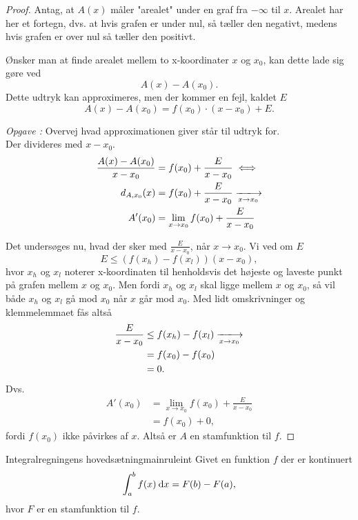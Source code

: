 \documentclass{article}
\newcounter{opgavecnt}
\newcommand{\opg}[1]{\stepcounter{opgavecnt}\textit{Opgave \arabic{opgavecnt}: }#1}
\begin{document}
\begin{proof}
Antag, at $A(x)$ måler "arealet" under en graf fra $-\infty$ til $x$. Arealet
har her et fortegn, dvs. at hvis grafen er under nul, så tæller den negativt,
medens hvis grafen er over nul så tæller den positivt.

Ønsker man at finde arealet mellem to x-koordinater $x$ og $x_0$, kan dette
lade sig gøre ved
\[
    A(x) - A(x_0).
\] 
Dette udtryk kan approximeres, men der kommer en fejl, kaldet $E$
\[
    A(x) - A(x_0) = f(x_0) \cdot (x-x_0) + E.
\] 

\opg{Overvej hvad approximationen giver står til udtryk for.}\\
Der divideres med $x-x_0$.
\begin{align*}
    \frac{A(x)-A(x_0)}{x-x_0} &= f(x_0) + \frac{E}{x-x_0}\iff\\
    \sek{A}{x_0}(x) &= f(x_0) + \frac{E}{x-x_0} \xlongrightarrow[x \to x_0]{}\\
    A'(x_0) &= \lim_{x \to x_0} f(x_0) + \frac{E}{x-x_0}
\end{align*}

Det undersøges nu, hvad der sker med $\frac{E}{x-x_0}$, når $x \to x_0$.
Vi ved om $E$
\[
    E \le (f(x_h) - f(x_l))(x-x_0),
\] 
hvor $x_h$ og $x_l$ noterer x-koordinaten til henholdsvis det højeste og
laveste punkt på grafen mellem $x$ og $x_0$. Men fordi $x_h$ og $x_l$ skal
ligge mellem $x$ og $x_0$, så vil både $x_h$ og $x_l$ gå mod $x_0$ når $x$ går
mod $x_0$. Med lidt omskrivninger og klemmelemmaet fås altså
\begin{align*}
    \frac{E}{x-x_0} &\le f(x_h) - f(x_l) \xlongrightarrow[x \to x_0]{}\\
                    &= f(x_0) - f(x_0)\\
                    &= 0.
\end{align*}
Dvs.
\begin{align*}
    A'(x_0) &= \lim_{x \to x_0} f(x_0) + \frac{E}{x-x_0}\\
           &= f(x_0) + 0,
\end{align*}
fordi $f(x_0)$ ikke påvirkes af $x$. Altså er $A$ en stamfunktion til $f$.
\end{proof}

\begin{theorem}{Integralregningens hovedsætning}{mainruleint}
    Givet en funktion $f$ der er kontinuert
    \[
        \int_a^b f(x) \:\mathrm{d}x = F(b) - F(a),
    \]
    hvor $F$ er en stamfunktion til $f$.
\end{theorem}
\end{document}
